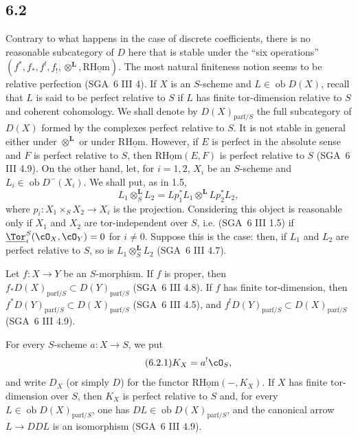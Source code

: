 \subsection*{6.2}
Contrary to what happens in the case of discrete coefficients, there is no reasonable subcategory of $D$ here that is stable under the ``six operations'' $(f^*,f_*,f^!,f_!,\otimes^{\mathbf L},\mathrm{R}\underline{\mathrm{Hom}})$. The most natural finiteness notion seems to be relative perfection (SGA~6 III 4). If $X$ is an $S$-scheme and $L\in\operatorname{ob}D(X)$, recall that $L$ is said to be perfect relative to $S$ if $L$ has finite tor-dimension relative to $S$ and coherent cohomology. We shall denote by $D(X)_{\mathrm{parf}/S}$ the full subcategory of $D(X)$ formed by the complexes perfect relative to $S$. It is not stable in general either under $\otimes^{\mathbf L}$ or under $\mathrm{R}\underline{\mathrm{Hom}}$. However, if $E$ is perfect in the absolute sense and $F$ is perfect relative to $S$, then $\mathrm{R}\underline{\mathrm{Hom}}(E,F)$ is perfect relative to $S$ (SGA~6 III 4.9). On the other hand, let, for $i=1,2$, $X_i$ be an $S$-scheme and $L_i\in\operatorname{ob}D^{-}(X_i)$. We shall put, as in 1.5,
\[
L_1\otimes_S^{\mathbf L}L_2=Lp_1^*L_1\otimes^{\mathbf L}Lp_2^*L_2,
\]
where $p_i:X_1\times_SX_2\to X_i$ is the projection. Considering this object is reasonable only if $X_1$ and $X_2$ are tor-independent over $S$, i.e. (SGA~6 III 1.5) if $\underline{\Tor}_i^S(\cO_X,\cO_Y)=0$ for $i\ne0$. Suppose this is the case: then, if $L_1$ and $L_2$ are perfect relative to $S$, so is $L_1\otimes_S^{\mathbf L}L_2$ (SGA~6 III 4.7).

Let $f:X\to Y$ be an $S$-morphism. If $f$ is proper, then $f_*D(X)_{\mathrm{parf}/S}\subset D(Y)_{\mathrm{parf}/S}$ (SGA~6 III 4.8). If $f$ has finite tor-dimension, then $f^*D(Y)_{\mathrm{parf}/S}\subset D(X)_{\mathrm{parf}/S}$ (SGA~6 III 4.5), and $f^!D(Y)_{\mathrm{parf}/S}\subset D(X)_{\mathrm{parf}/S}$ (SGA~6 III 4.9).

For every $S$-scheme $a:X\to S$, we put
\begin{equation}
\tag{6.2.1}
K_X=a^!\cO_S,
\end{equation}
and write $D_X$ (or simply $D$) for the functor $\mathrm{R}\underline{\mathrm{Hom}}(-,K_X)$. If $X$ has finite tor-dimension over $S$, then $K_X$ is perfect relative to $S$ and, for every $L\in\operatorname{ob}D(X)_{\mathrm{parf}/S}$, one has $DL\in\operatorname{ob}D(X)_{\mathrm{parf}/S}$, and the canonical arrow $L\to DDL$ is an isomorphism (SGA~6 III 4.9).

